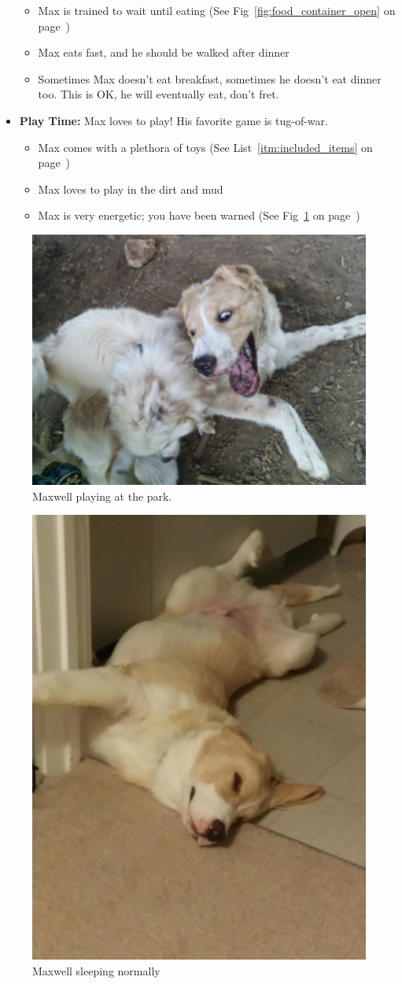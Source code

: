 \documentclass[pdftex,12pt]{article}
\begin{document}
\begin{itemize}
\begin{itemize}
            \item Max is trained to wait until eating
                (See Fig~\ref{fig:food_container_open} on
                page~\pageref{fig:food_container_open})
            \item Max eats fast, and he should be walked after dinner
            \item Sometimes Max doesn't eat breakfast, sometimes he doesn't eat dinner too.
                This is OK, he will eventually eat, don't fret.
        \end{itemize}
    \item \textbf{Play Time:} Max loves to play! His favorite game is tug-of-war.
        \begin{itemize}
            \item Max comes with a plethora of toys
                (See List~\ref{itm:included_items} on
                page~\pageref{itm:included_items})
            \item Max loves to play in the dirt and mud
            \item Max is very energetic; you have been warned
                (See Fig~\ref{fig:at_the_park} on
                page~\pageref{fig:at_the_park})
        \end{itemize}
\end{itemize}

\clearpage

\vspace*{\fill}

\begin{figure}[h!]
    \centering
    \includegraphics[width=.35\textwidth]{./images/max/at_the_park.jpg}
    \caption{Maxwell playing at the park.}
    \label{fig:at_the_park}
\end{figure}

\bigskip

\begin{figure}[h!]
    \centering
    \includegraphics[width=.35\textwidth]{./images/max/sleeping.jpg}
    \caption{Maxwell sleeping normally}
    \label{fig:sleeping}
\end{figure}
\end{document}
